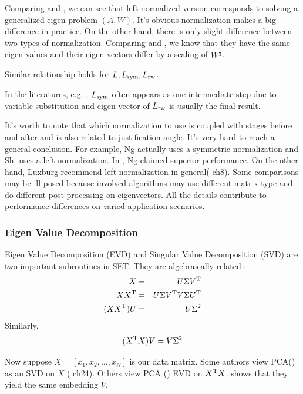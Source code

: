 Comparing \req{\ref{eq:eiga}} and \req{\ref{eq:eigarw1}}, we can see that 
left normalized version corresponds to solving a generalized eigen
problem $ (A, W) $. It's obvious normalization makes a big difference 
in practice. On the other hand, there is only slight difference 
between two types of normalization. 
Comparing \req{\ref{eq:eigarw2}} and \req{\ref{eq:eigasym}}, 
we know that they have the same eigen values and their eigen vectors
differ by a scaling of $ W^{\frac{1}{2}} $. 

Similar relationship holds for $ L, L_{\text{sym}}, L_{\text{rw}} $. 

In the literatures, e.g. \cite{belkin2003laplacian}
\cite{shi2000normalized}, $ L_{\text{sym}} $ often appears as 
one intermediate step due to variable substitution and 
eigen vector of $ L_{\text{rw}} $ is usually the final result. 

It's worth to note that which normalization to use is 
coupled with stages before and after
and is also related to justification angle. It's very hard to 
reach a general conclusion. For example, Ng\cite{ng2002spectral}
actually uses a symmetric normalization and Shi\cite{shi2000normalized}
uses a left normalization. In \cite{ng2002spectral}, Ng 
claimed superior performance. On the other hand, Luxburg
recommend left normalization in general(\cite{von2007tutorial} ch8). 
Some comparisons may be ill-posed because involved algorithms 
may use different matrix type and do different post-processing 
on eigenvectors. All the details contribute to performance 
differences on varied application scenarios. 

\subsubsection{Eigen Value Decomposition}

Eigen Value Decomposition (EVD) and Singular Value Decomposition (SVD)
are two important subroutines in SET. They are algebraically related
\cite{wiki_svd}:
\begin{eqnarray}
	X &=& U \Sigma V^\mathrm{T} \\
	XX^\mathrm{T} &=& U \Sigma V^\mathrm{T} V \Sigma U^\mathrm{T} \\
	(XX^\mathrm{T}) U &=& U \Sigma^2 
\end{eqnarray}
Similarly, 
\begin{equation}
	(X^\mathrm{T}X) V = V \Sigma^2 
	\label{eq:svd_evd_rel}
\end{equation}

Now suppose $ X = [x_1, x_2, \ldots, x_N] $ is our data matrix. 
Some authors view PCA(\rsec{\ref{sec:pca}}) 
as an SVD on $ X $ (\cite{borg2005modern} ch24). 
Others view PCA (\rsec{\ref{sec:pca}}) EVD on $ X^\mathrm{T}X $. 
\req{\ref{eq:svd_evd_rel}} shows that they yield the 
same embedding $ V $. 

